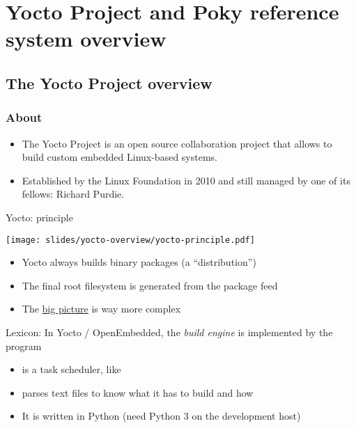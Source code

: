 \section{Yocto Project and Poky reference system overview}

\subsection{The Yocto Project overview}

\begin{frame}
  \frametitle{About}
  \begin{itemize}
  \item The Yocto Project is an open source collaboration project
        that allows to build custom embedded Linux-based systems.
  \item Established by the Linux Foundation in 2010 and still managed by
    one of its fellows: Richard Purdie.
  \end{itemize}
\end{frame}

\begin{frame}{Yocto: principle}
  \begin{center}
    \texttt{[image: slides/yocto-overview/yocto-principle.pdf]}
  \end{center}
  \begin{itemize}
  \item Yocto always builds binary packages (a ``distribution'')
  \item The final root filesystem is generated from the package feed
  \item The \href{https://docs.yoctoproject.org/_images/YP-flow-diagram.png}
                 {big picture} is way more complex
  \end{itemize}
\end{frame}

\begin{frame}{Lexicon: }
  In Yocto / OpenEmbedded, the {\em build engine} is implemented by the
   program
  \begin{itemize}
    \item {} is a task scheduler, like 
    \item {} parses text files
      to know what it has to build and how
    \item It is written in Python (need Python 3 on the development host)
  \end{itemize}
\end{frame}

